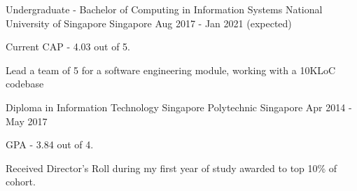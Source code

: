 

\begin{cventries}

  \cventry
    {Undergraduate - Bachelor of Computing in Information Systems} %
    {National University of Singapore} %
    {Singapore} %
    {Aug 2017 - Jan 2021 (expected)} %
    {
      \begin{cvitems} %
        \item {Current CAP - 4.03 out of 5.}
        \item {Lead a team of 5 for a software engineering module, working with a 10KLoC codebase}
      \end{cvitems}
    }

  \cventry
    {Diploma in Information Technology} %
    {Singapore Polytechnic} %
    {Singapore} %
    {Apr 2014 - May 2017} %
    {
      \begin{cvitems} %
        \item {GPA - 3.84 out of 4.}
        \item {Received Director's Roll during my first year of study awarded to top 10\% of cohort.}
      \end{cvitems}
    }

\end{cventries}
